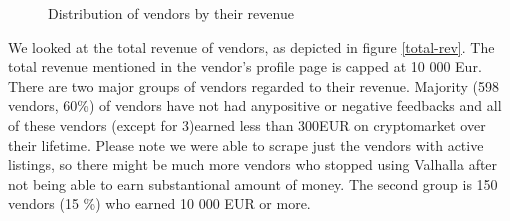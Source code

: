\documentclass[
  digital, %
  table,   %
  lof,     %
  lot,     %
  oneside
]{fithesis3}
\begin{document}
\begin{figure}[!htb]

    
\caption{Distribution of vendors by their revenue}
\end{figure}

We looked at the total revenue of vendors, as depicted in figure \ref{total-rev}. 
The total revenue mentioned in the vendor's profile page is capped at 10 000 Eur.
There are two major groups of vendors regarded to their revenue. 
Majority (598 vendors, 60\%) of vendors have not had any\newline positive or negative feedbacks and all of these vendors
(except for 3)\newline earned less than 300EUR on cryptomarket over their lifetime.
Please note we were able to scrape just the vendors with active listings,
so there might be much more vendors who stopped using Valhalla after
not being able to earn substantional amount of money.
The second group is 150 vendors (15 \%) who earned 10 000 EUR or more.
\end{document}
